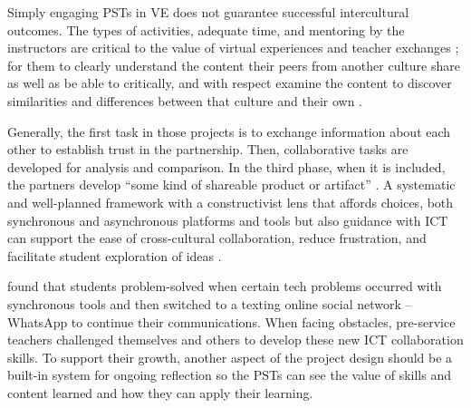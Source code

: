 Simply engaging PSTs in VE does not guarantee successful intercultural
outcomes. The types of activities, adequate time, and mentoring by the
instructors are critical to the value of virtual experiences and teacher
exchanges \cite{fuchs2022value}; for them to clearly understand
the content their peers from another culture share as well as be able to
critically, and with respect examine the content to discover
similarities and differences between that culture and their own \cite{roarty2021analysis}.
	
Generally, the first task in those projects is to exchange information
about each other to establish trust in the partnership. Then,
collaborative tasks are developed for analysis and comparison. In the
third phase, when it is included, the partners develop \enquote{some kind of
shareable product or artifact} \cite{godwin-jones2019telecollaboration}. A systematic and
well-planned framework with a constructivist lens that affords choices,
both synchronous and asynchronous platforms and tools but also guidance
with ICT can support the ease of cross-cultural collaboration, reduce
frustration, and facilitate student exploration of ideas \cite{calvo2023investigating,hauck2020approaches,kopish2020leveraging}.
		
\textcite{evaluate2019evaluating} found that students problem-solved when
certain tech problems occurred with synchronous tools and then switched
to a texting online social network -- WhatsApp to continue their
communications. When facing obstacles, pre-service teachers challenged
themselves and others to develop these new ICT collaboration skills. To
support their growth, another aspect of the project design should be a
built-in system for ongoing reflection so the PSTs can see the value of
skills and content learned and how they can apply their learning.
